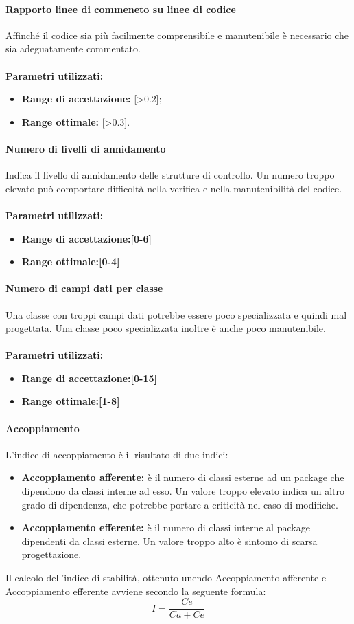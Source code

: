 \documentclass[12pt,a4paper,titlepage]{article}
\begin{document}
			\paragraph{Rapporto linee di commeneto su linee di codice}
			Affinché il codice sia più facilmente comprensibile e manutenibile è necessario che sia adeguatamente commentato.
			\\ \\
			\textbf{Parametri utilizzati:}
			\begin{itemize}
				\item \textbf{Range di accettazione:} [>0.2];
				\item \textbf{Range ottimale:} [>0.3].
			\end{itemize}
			\paragraph{Numero di livelli di annidamento}
			Indica il livello di annidamento delle strutture di controllo. Un numero troppo elevato può comportare difficoltà nella verifica e nella manutenibilità del codice.
			\\ \\
			\textbf{Parametri utilizzati:}
			\begin{itemize}
				\item \textbf{Range di accettazione:[0-6]}
				\item \textbf{Range ottimale:[0-4]}
			\end{itemize}
			\paragraph{Numero di campi dati per classe}
			Una classe con troppi campi dati potrebbe essere poco specializzata e quindi mal progettata. Una classe poco specializzata inoltre è anche poco manutenibile.
			\\ \\
			\textbf{Parametri utilizzati:}
			\begin{itemize}
				\item \textbf{Range di accettazione:[0-15]}
				\item \textbf{Range ottimale:[1-8]}
			\end{itemize}
			\paragraph{Accoppiamento}
			L'indice di accoppiamento è il risultato di due indici:
			\begin{itemize}
				\item \textbf{Accoppiamento afferente:} è il numero di classi esterne ad un package che dipendono da classi interne ad esso. Un valore troppo elevato indica un altro grado di dipendenza, che potrebbe portare a criticità nel caso di modifiche.
				\item \textbf{Accoppiamento efferente:} è il numero di classi interne al package dipendenti da classi esterne. Un valore troppo alto è sintomo di scarsa progettazione.
			\end{itemize}			
			Il calcolo dell'indice di stabilità, ottenuto unendo Accoppiamento afferente e Accoppiamento efferente avviene secondo la seguente formula:
			\[I=\frac{Ce}{Ca+Ce}\]
\end{document}
